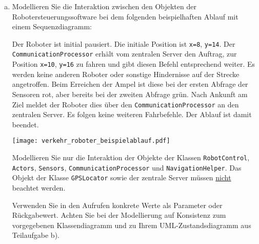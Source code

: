 \begin{enumerate}[a) ,resume]
	\item Modellieren Sie die Interaktion zwischen den Objekten der Robotersteuerungssoftware bei dem folgenden beispielhaften Ablauf mit einem Sequenzdiagramm:


    \begin{minipage}{.7\textwidth}
    	Der Roboter ist initial pausiert. Die initiale Position ist \texttt{x=8}, \texttt{y=14}. 
		Der \texttt{CommunicationProcessor} erhält vom zentralen Server den Auftrag, zur Position \texttt{x=10}, \texttt{y=16} zu fahren und gibt diesen Befehl entsprechend weiter.
		Es werden keine anderen Roboter oder sonstige Hindernisse auf der Strecke angetroffen.
		Beim Erreichen der Ampel ist diese bei der ersten Abfrage der Sensoren rot, aber bereits bei der zweiten Abfrage grün.
		Nach Ankunft am Ziel meldet der Roboter dies über den \texttt{CommunicationProcessor} an den zentralen Server. Es folgen keine weiteren Fahrbefehle. Der Ablauf ist damit beendet.
    \end{minipage}
    \begin{minipage}{.25\textwidth}
		\begin{center}			
	    	\texttt{[image: verkehr\_roboter\_beispielablauf.pdf]}
		\end{center}			
    \end{minipage}

	Modellieren Sie nur die Interaktion der Objekte der Klassen \texttt{RobotControl}, \texttt{Actors}, \texttt{Sensors}, \texttt{CommunicationProcessor} und \texttt{NavigationHelper}.
	Das Objekt der Klasse \texttt{GPSLocator} sowie der zentrale Server müssen \underline{nicht} beachtet werden.

	Verwenden Sie in den Aufrufen konkrete Werte als Parameter oder Rückgabewert.
%
	Achten Sie bei der Modellierung auf Konsistenz zum vorgegebenen Klassendiagramm und zu Ihrem UML-Zustandsdiagramm aus Teilaufgabe b). 

\end{enumerate}


